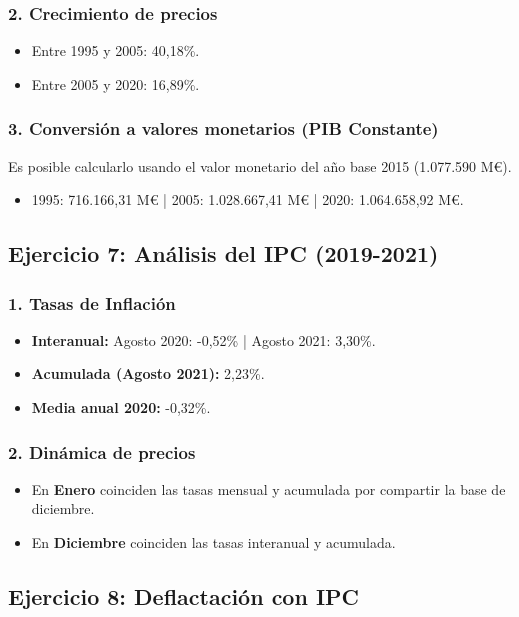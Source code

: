 \subsubsection{2. Crecimiento de precios}
\begin{itemize}
    \item Entre 1995 y 2005: 40,18\%.
    \item Entre 2005 y 2020: 16,89\%.
\end{itemize}

\subsubsection{3. Conversión a valores monetarios (PIB Constante)}
Es posible calcularlo usando el valor monetario del año base 2015 (1.077.590 M€).
\begin{itemize}
    \item 1995: 716.166,31 M€ | 2005: 1.028.667,41 M€ | 2020: 1.064.658,92 M€.
\end{itemize}

\subsection{Ejercicio 7: Análisis del IPC (2019-2021)}

\subsubsection{1. Tasas de Inflación}
\begin{itemize}
    \item \textbf{Interanual:} Agosto 2020: -0,52\% | Agosto 2021: 3,30\%.
    \item \textbf{Acumulada (Agosto 2021):} 2,23\%.
    \item \textbf{Media anual 2020:} -0,32\%.
\end{itemize}

\subsubsection{2. Dinámica de precios}
\begin{itemize}
    \item En \textbf{Enero} coinciden las tasas mensual y acumulada por compartir la base de diciembre.
    \item En \textbf{Diciembre} coinciden las tasas interanual y acumulada.
\end{itemize}

\subsection{Ejercicio 8: Deflactación con IPC}

